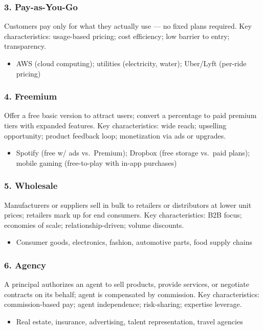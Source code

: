 \documentclass[11pt, letterpaper]{article}
\begin{document}
\subsubsection{3. Pay-as-You-Go}
Customers pay only for what they actually use --- no fixed plans required.
Key characteristics: usage-based pricing; cost efficiency; low barrier to entry; transparency.
\begin{itemize}[leftmargin=*]
  \item AWS (cloud computing); utilities (electricity, water); Uber/Lyft (per-ride pricing)
\end{itemize}

\subsubsection{4. Freemium}
Offer a free basic version to attract users; convert a percentage to paid premium tiers with expanded features.
Key characteristics: wide reach; upselling opportunity; product feedback loop; monetization via ads or upgrades.
\begin{itemize}[leftmargin=*]
  \item Spotify (free w/ ads vs.\ Premium); Dropbox (free storage vs.\ paid plans); mobile gaming (free-to-play with in-app purchases)
\end{itemize}

\subsubsection{5. Wholesale}
Manufacturers or suppliers sell in bulk to retailers or distributors at lower unit prices; retailers mark up for end consumers.
Key characteristics: B2B focus; economies of scale; relationship-driven; volume discounts.
\begin{itemize}[leftmargin=*]
  \item Consumer goods, electronics, fashion, automotive parts, food supply chains
\end{itemize}

\subsubsection{6. Agency}
A principal authorizes an agent to sell products, provide services, or negotiate contracts on its behalf; agent is compensated by commission.
Key characteristics: commission-based pay; agent independence; risk-sharing; expertise leverage.
\begin{itemize}[leftmargin=*]
  \item Real estate, insurance, advertising, talent representation, travel agencies
\end{itemize}
\end{document}
